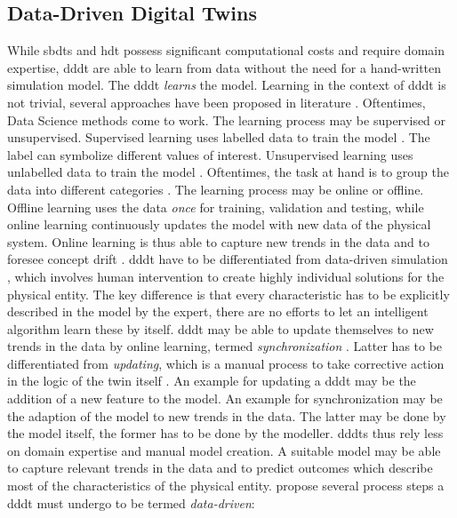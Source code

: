 \subsection*{Data-Driven Digital Twins}
\label{sec:data-driven-digital-twins}

While \gls{sbdt}s and \gls{hdt} possess significant computational costs and require domain expertise, \gls{dddt} are able to learn from data without the need for a hand-written simulation model. The \gls{dddt} \textit{learns} the model. Learning in the context of \gls{dddt} is not trivial, several approaches have been proposed in literature \autocite{he2019data,Friederich2022,francis2021towards}. Oftentimes, Data Science methods come to work. The learning process may be supervised or unsupervised. Supervised learning uses labelled data to train the model \autocite{cunningham2008supervised}. The label can symbolize different values of interest. Unsupervised learning uses unlabelled data to train the model \autocite{barlow1989unsupervised}. Oftentimes, the task at hand is to group the data into different categories \autocite{Biesinger2019}.
The learning process may be online or offline. Offline learning uses the data \textit{once} for training, validation and testing, while online learning continuously updates the model with new data of the physical system. Online learning is thus able to capture new trends in the data and to foresee concept drift \autocite{tsymbal2004problem}. \gls{dddt} have to be differentiated from data-driven simulation \autocite{Charpentier2014}, which involves human intervention to create highly individual solutions for the physical entity. The key difference is that every characteristic has to be explicitly described in the model by the expert, there are no efforts to let an intelligent algorithm learn these by itself. \gls{dddt} may be able to update themselves to new trends in the data by online learning, termed \textit{synchronization} \autocite{reinhardt2019survey}. Latter has to be differentiated from \textit{updating}, which is a manual process to take corrective action in the logic of the twin itself \autocite{Schwede2024}. An example for updating a \gls{dddt} may be the addition of a new feature to the model. An example for synchronization may be the adaption of the model to new trends in the data. The latter may be done by the model itself, the former has to be done by the modeller.
\gls{dddt}s thus rely less on domain expertise and manual model creation. A suitable model may be able to capture relevant trends in the data and to predict outcomes which describe most of the characteristics of the physical entity. \textcite{francis2021towards} propose several process steps a \gls{dddt} must undergo to be termed \textit{data-driven}:

